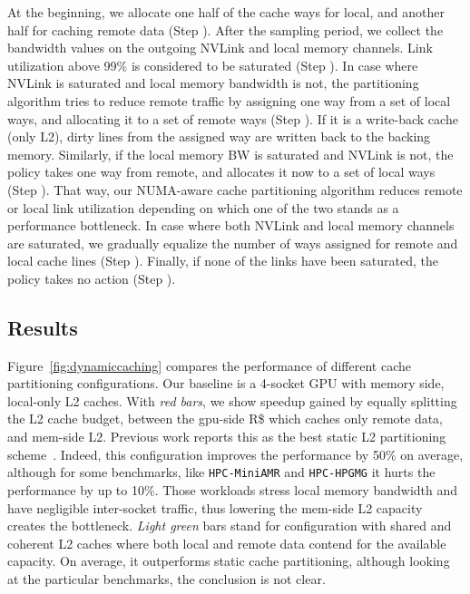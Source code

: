 At the beginning, we allocate one half of the cache ways for local, and another half for caching 
remote data (Step ). After the sampling period, we collect the 
bandwidth values on the outgoing NVLink and local memory channels. Link 
utilization above 99\% is considered to be saturated (Step ). 
In case where NVLink is saturated and local memory bandwidth is not, the 
partitioning algorithm tries to reduce remote traffic by assigning one way 
from a set of local ways, and allocating it to a set of remote ways 
(Step ). If it is a write-back cache (only L2), dirty lines from the 
assigned way are written back to the backing memory. Similarly, if the local 
memory BW is saturated and NVLink is not, the policy takes one way from 
remote, and allocates it now to a set of local ways (Step ). That way, our NUMA-aware cache partitioning algorithm reduces 
remote or local link utilization depending on which one of the two stands as 
a performance bottleneck. In case where both NVLink and local memory channels 
are saturated, we gradually equalize the number of ways assigned for remote 
and local cache lines (Step ). Finally, if none of the links have 
been saturated, the policy takes no action (Step ).


\subsection{Results}

Figure~\ref{fig:dynamiccaching} compares the performance of different cache partitioning configurations. Our baseline is a 4-socket GPU with memory side, local-only L2 caches. With \emph{red bars}, we show speedup gained by equally splitting the L2 cache budget, between the gpu-side R\$ which caches only remote data, and mem-side L2. Previous work reports this as the best static L2 partitioning scheme~\cite{Arunkumar2017}. Indeed, this configuration improves the performance by 50\% on average, although for some benchmarks, like \texttt{HPC-MiniAMR} and \texttt{HPC-HPGMG} it hurts the performance by up to 10\%. Those workloads stress local memory bandwidth and have negligible inter-socket traffic, thus lowering the mem-side L2 capacity creates the bottleneck. \emph{Light green} bars stand for configuration with shared and coherent L2 caches where both local and remote data contend for the available capacity. On average, it outperforms static cache partitioning, although looking at the particular benchmarks, the conclusion is not clear.

